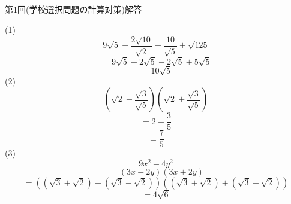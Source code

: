 \documentclass{jarticle}
\begin{document}
\begin{center}
第1回(学校選択問題の計算対策)解答
\end{center}
(1)
\[9\sqrt{5}-\frac{2\sqrt{10}}{\sqrt{2}}-\frac{10}{\sqrt{5}}+\sqrt{125}\]
\[=9\sqrt{5}-2\sqrt{5}-2\sqrt{5}+5\sqrt{5}\]
\[=10\sqrt{5}\]
(2)
\[(\sqrt{2}-\frac{\sqrt{3}}{\sqrt{5}})(\sqrt{2}+\frac{\sqrt{3}}{\sqrt{5}})\]
\[=2-\frac{3}{5}\]
\[=\frac{7}{5}\]
(3)
\[9x^{2}-4y^{2}\]
\[=(3x-2y)(3x+2y)\]
\[=((\sqrt{3}+\sqrt{2})-(\sqrt{3}-\sqrt{2}))((\sqrt{3}+\sqrt{2})+(\sqrt{3}-\sqrt{2}))\]
\[=4\sqrt{6}\]
\end{document}
